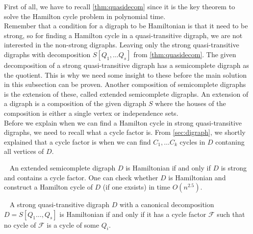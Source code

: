 First of all, we have to recall \autoref{thm:quasidecom} since it is the key theorem to solve the Hamilton cycle problem in polynomial time. \\
Remember that a condition for a digraph to be Hamiltonian is that it need to be strong, so for finding a Hamilton cycle in a quasi-transitive digraph, we are not interested in the non-strong digraphs. 
Leaving only the strong quasi-transitive digraphs with decomposition $S[Q_1,\dots Q_s]$ from \autoref{thm:quasidecom}. 
The given decomposition of a strong quasi-transitive digraph has a semicomplete digraph as the quotient. This is why we need some insight to these before the main solution in this subsection can be proven. 
Another composition of semicomplete digraphs is the extension of these, called extended semicomplete digraphs. 
An extension of a digraph is a composition of the given digraph $S$ where the houses of the composition is either a single vertex or independence sets. \\
Before we explain when we can find a Hamilton cycle in strong quasi-transitive digraphs, we need to recall what a cycle factor is. 
From \autoref{sec:digraph}, we shortly explained that a cycle factor is when we can find $C_1,\dots C_k$ cycles in $D$ contaning all vertices of $D$. 
\begin{thm}~\cite{gutinMNN2}
    An extended semicomplete digraph $D$ is Hamiltonian if and only if $D$ is strong and contains a cycle factor. One can check whether $D$ is Hamiltonian and construct a Hamilton cycle of $D$ (if one exsists) in time $O(n^{2.5})$.
    \label{thm:extended}
\end{thm}
\begin{thm}~\cite{bangJGT20}
    A strong quasi-transitive digraph $D$ with a canonical decomposition \\$D=S[Q_1\dots, Q_s]$ is Hamiltonian if and only if it has a cycle factor $\mathcal{F}$ such that no cycle of $\mathcal{F}$ is a cycle of some $Q_i$.
    \label{thm:qhcycle}
\end{thm}
